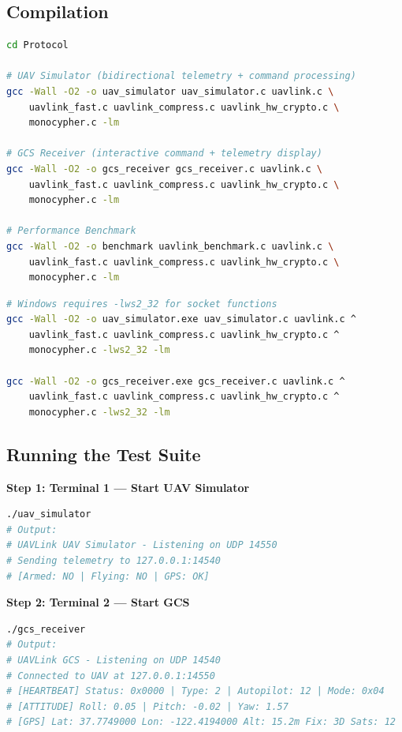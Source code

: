 \documentclass[11pt,a4paper]{article}
\begin{document}
\subsection{Compilation}

\begin{lstlisting}[language=bash,caption={Linux/macOS build}]
cd Protocol

# UAV Simulator (bidirectional telemetry + command processing)
gcc -Wall -O2 -o uav_simulator uav_simulator.c uavlink.c \
    uavlink_fast.c uavlink_compress.c uavlink_hw_crypto.c \
    monocypher.c -lm

# GCS Receiver (interactive command + telemetry display)
gcc -Wall -O2 -o gcs_receiver gcs_receiver.c uavlink.c \
    uavlink_fast.c uavlink_compress.c uavlink_hw_crypto.c \
    monocypher.c -lm

# Performance Benchmark
gcc -Wall -O2 -o benchmark uavlink_benchmark.c uavlink.c \
    uavlink_fast.c uavlink_compress.c uavlink_hw_crypto.c \
    monocypher.c -lm
\end{lstlisting}

\begin{lstlisting}[language=bash,caption={Windows build (MinGW or MSVC)}]
# Windows requires -lws2_32 for socket functions
gcc -Wall -O2 -o uav_simulator.exe uav_simulator.c uavlink.c ^
    uavlink_fast.c uavlink_compress.c uavlink_hw_crypto.c ^
    monocypher.c -lws2_32 -lm

gcc -Wall -O2 -o gcs_receiver.exe gcs_receiver.c uavlink.c ^
    uavlink_fast.c uavlink_compress.c uavlink_hw_crypto.c ^
    monocypher.c -lws2_32 -lm
\end{lstlisting}

\subsection{Running the Test Suite}

\textbf{Step 1: Terminal 1 --- Start UAV Simulator}
\begin{lstlisting}[language=bash]
./uav_simulator
# Output:
# UAVLink UAV Simulator - Listening on UDP 14550
# Sending telemetry to 127.0.0.1:14540
# [Armed: NO | Flying: NO | GPS: OK]
\end{lstlisting}

\textbf{Step 2: Terminal 2 --- Start GCS}
\begin{lstlisting}[language=bash]
./gcs_receiver
# Output:
# UAVLink GCS - Listening on UDP 14540
# Connected to UAV at 127.0.0.1:14550
# [HEARTBEAT] Status: 0x0000 | Type: 2 | Autopilot: 12 | Mode: 0x04
# [ATTITUDE] Roll: 0.05 | Pitch: -0.02 | Yaw: 1.57
# [GPS] Lat: 37.7749000 Lon: -122.4194000 Alt: 15.2m Fix: 3D Sats: 12
\end{lstlisting}
\end{document}
